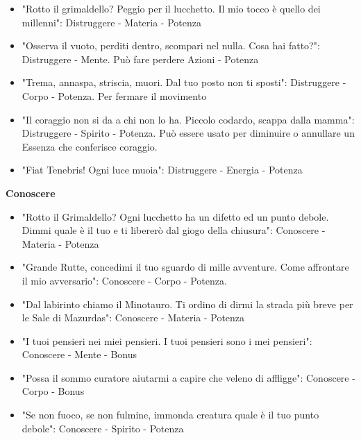 \documentclass[a4paper,twoside,openany]{book}
\begin{document}
\begin{multicols}{2}
\begin{itemize}[leftmargin=*] \setlength{\itemsep}{0pt}	
\item "Rotto il grimaldello? Peggio per il lucchetto. Il mio tocco è quello dei millenni": Distruggere - Materia - Potenza
\item "Osserva il vuoto, perditi dentro, scompari nel nulla. Cosa hai fatto?": Distruggere - Mente. Può fare perdere Azioni - Potenza
\item "Trema, annaspa, striscia, muori. Dal tuo posto non ti sposti": Distruggere - Corpo - Potenza. Per fermare il movimento
\item "Il coraggio non si da a chi non lo ha. Piccolo codardo, scappa dalla mamma": Distruggere - Spirito - Potenza. Può essere usato per diminuire o annullare un Essenza che conferisce coraggio.
\item "Fiat Tenebris! Ogni luce muoia": Distruggere - Energia - Potenza
\end{itemize}

\textbf{Conoscere}
\begin{itemize}[leftmargin=*] \setlength{\itemsep}{0pt}	
\item "Rotto il Grimaldello? Ogni lucchetto ha un difetto ed un punto debole. Dimmi quale è il tuo e ti libererò dal giogo della chiusura": Conoscere - Materia - Potenza
\item "Grande Rutte, concedimi il tuo sguardo di mille avventure. Come affrontare il mio avversario": Conoscere - Corpo - Potenza.
\item "Dal labirinto chiamo il Minotauro. Ti ordino di dirmi la strada più breve per le Sale di Mazurdas": Conoscere - Materia - Potenza
\item "I tuoi pensieri nei miei pensieri. I tuoi pensieri sono i mei pensieri": Conoscere - Mente - Bonus
\item "Possa il sommo curatore aiutarmi a capire che veleno di affligge": Conoscere - Corpo - Bonus
\item "Se non fuoco, se non fulmine, immonda creatura quale è il tuo punto debole": Conoscere - Spirito - Potenza
\end{itemize}


\end{multicols}
\end{document}
